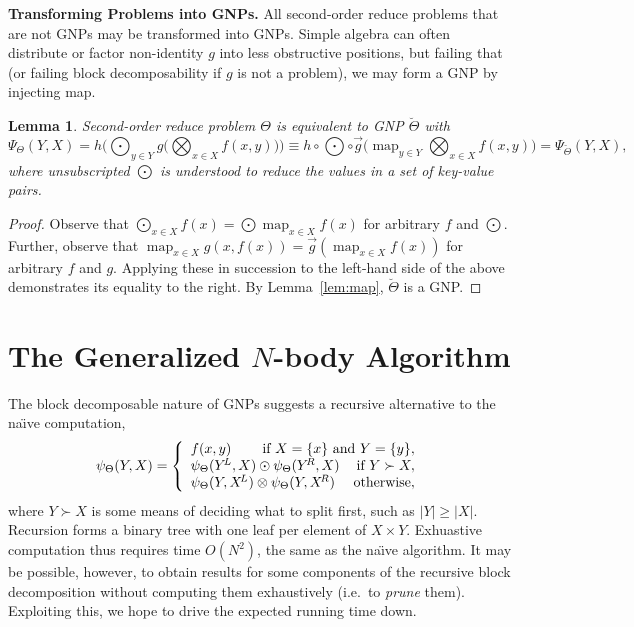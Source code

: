 \documentclass{article}
\newtheorem{lemma}{Lemma}
\newcommand{\GNP}[1][\psi]{{#1}_{\Theta}}
\DeclareMathOperator*{\map}{map}
\newcommand{\comp}{\mathbin{\circ}}
\begin{document}
{\bf Transforming Problems into GNPs.}  All second-order reduce
problems that are not GNPs may be transformed into GNPs.  Simple
algebra can often distribute or factor non-identity $g$ into less
obstructive positions, but failing that (or failing block
decomposability if $g$ is not a problem), we may form a GNP by
injecting map.
\begin{lemma}
  Second-order reduce problem $\Theta$ is equivalent to
  GNP $\breve{\Theta}$ with
  \[
  \Psi_{\Theta}(Y,X) = h \Big( \bigodot_{y \in Y} g \Big( \bigotimes_{x \in X} f(x,y) \Big) \Big) \equiv h \comp {\textstyle \bigodot} \comp \overrightarrow{g} \Big( \map_{y \in Y} \bigotimes_{x \in X} f(x,y) \Big) = \Psi_{\breve{\Theta}}(Y,X),
  \]
  where unsubscripted $\bigodot$ is understood to reduce the values in
  a set of key-value pairs.
\end{lemma}
\begin{proof}
  Observe that $\bigodot_{x \in X} f(x) = \bigodot{} \map_{x \in X}
  f(x)$ for arbitrary $f$ and $\bigodot$.  Further, observe that
  $\map_{x \in X} g(x,f(x)) = \overrightarrow{g} \left( \map_{x \in X}
  f(x) \right)$ for arbitrary $f$ and $g$.  Applying these in
  succession to the left-hand side of the above demonstrates its
  equality to the right.  By Lemma~\ref{lem:map}, $\breve{\Theta}$ is
  a GNP.
\end{proof}

\section{The Generalized $N$-body Algorithm}

The block decomposable nature of GNPs suggests a recursive alternative
to the na\"{\i}ve computation,
\[
\GNP(Y,X) = \left\{ \begin{array}{lrr}
  f(x,y) & \multicolumn{2}{r}{\mbox{if } X = \{x\} \mbox{ and } Y = \{y\},} \\
  \multicolumn{2}{l}{\GNP(Y^{\!L},X) \odot \GNP(Y^{\!R},X)} & \mbox{if } Y \succ X, \\
  \multicolumn{2}{l}{\GNP(Y,X^{\!L}) \otimes \GNP(Y,X^{\!R})} & \mbox{otherwise},
\end{array} \right.
\]
where $Y \succ X$ is some means of deciding what to split first, such
as $|Y| \geq |X|$.  Recursion forms a binary tree with one leaf per
element of $X \times Y$.  Exhuastive computation thus requires time
$O(N^2)$, the same as the na\"{\i}ve algorithm.  It may be possible,
however, to obtain results for some components of the recursive block
decomposition without computing them exhaustively (i.e.~to {\em prune}
them).  Exploiting this, we hope to drive the expected running time
down.
\end{document}
